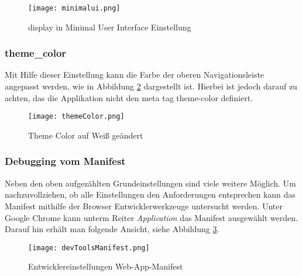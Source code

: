 \begin{figure}
    \texttt{[image: minimalui.png]}
    \caption{display in Minimal User Interface Einstellung}
    \label{img:minimalui}
\end{figure}

\subsubsection{theme\_color}
Mit Hilfe dieser Einstellung kann die Farbe der oberen Navigationsleiste angepasst werden, wie in Abbildung \ref{img:themeColor} dargestellt ist. Hierbei ist jedoch darauf zu achten, das die Applikation nicht den meta tag theme-color definiert. 

\begin{figure}[!htb]
    \texttt{[image: themeColor.png]}
    \caption{Theme Color auf Weiß geändert}
    \label{img:themeColor}
\end{figure}

\subsubsection{Debugging vom Manifest}

Neben den oben aufgezählten Grundeinstellungen sind viele weitere Möglich. Um nachzuvollziehen, ob alle Einstellungen den Anforderungen entsprechen kann das Manifest mithilfe der Browser Entwicklerwerkzeuge untersucht werden. Unter Google Chrome kann unterm Reiter \textit{Application} das Manifest ausgewählt werden. Darauf hin erhält man folgende Ansicht, siehe Abbildung \ref{img:devManifest}.

\begin{figure}[!htb]
    \centering
    \texttt{[image: devToolsManifest.png]}
    \caption{Entwicklereinstellungen Web-App-Manifest}
    \label{img:devManifest}
\end{figure}